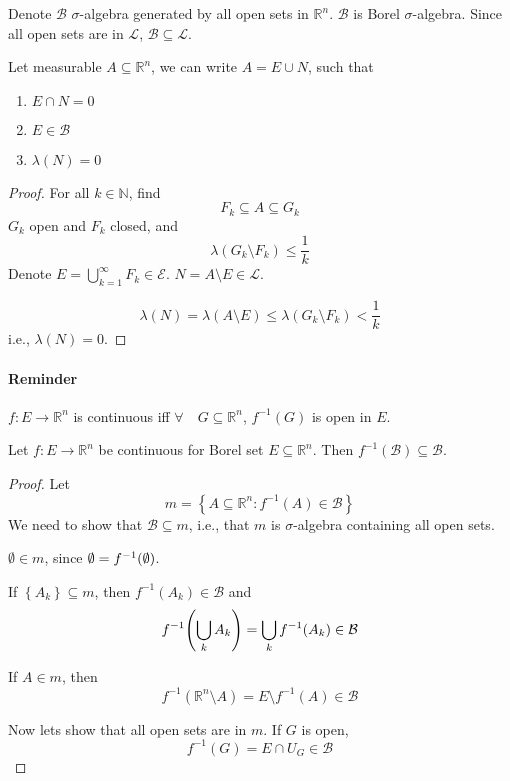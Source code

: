 Denote $\mathcal{B}$  $\sigma$-algebra  generated by all open sets in $\mathbb{R}^n$. $\mathcal{B}$ is Borel $\sigma$-algebra. Since all open sets are in $\mathcal{L}$, $\mathcal{B} \subseteq \mathcal{L}$.

\begin{theorem}
	Let measurable $A\subseteq \mathbb{R}^n$, we can write $A=E\cup N$, such that
	\begin{enumerate}
		\item $E\cap N=0$
		\item $E\in \mathcal{B}$
		\item $\lambda(N)=0$ 
	\end{enumerate}
\begin{proof}
	For all $k\in \mathbb{N}$, find
	$$F_k\subseteq A\subseteq G_k$$
	$G_k$ open and $F_k$ closed, and
	$$\lambda(G_k\setminus F_k) \leq \frac{1}{k}$$
	Denote $E = \bigcup_{k=1}^\infty F_k \in \mathcal{E}$. $N=A\setminus E \in \mathcal{L}$.
	
	$$\lambda(N) = \lambda(A\setminus E) \leq \lambda(G_k\setminus F_k) <\frac{1}{k}$$
	i.e., $\lambda(N)=0$.
\end{proof}

\end{theorem}

\paragraph{Reminder}
$f: E\to \mathbb{R}^n$ is continuous iff $\forall \quad G\subseteq \mathbb{R}^n$, $f^{-1}(G) $ is open in $E$.

\begin{theorem}
	Let $f: E \to \mathbb{R}^n$ be continuous for Borel set $E\subseteq \mathbb{R}^n$. Then $f^{-1}(\mathcal{B}) \subseteq \mathcal{B}$.
	\begin{proof}
		Let
		$$m = \left\{ A\subseteq \mathbb{R}^n : f^{-1}(A) \in \mathcal{B} \right\}$$
		We need to show that $\mathcal{B} \subseteq m$, i.e., that $m$ is $\sigma$-algebra containing all open sets.
		
		$\emptyset \in m$, since $\emptyset = f^{-1}\qty(\emptyset)$.
		
		If $\left\{ A_k \right\} \subseteq m$, then $f^{-1}(A_k) \in \mathcal{B}$ and
		$$f^{-1}\qty(\bigcup_k A_k) = \bigcup_k f^{-1}(A_k) \in \mathcal{B}$$
		
		If $A\in m$, then
		$$f^{-1}(\mathbb{R}^n \setminus A) = E\setminus f^{-1}(A) \in \mathcal{B} $$
		
		
		Now lets show that all open sets are in $m$. If $G$ is open,
		$$f^{-1}(G) = E\cap U_G \in \mathcal{B}$$
	\end{proof}
\end{theorem}

